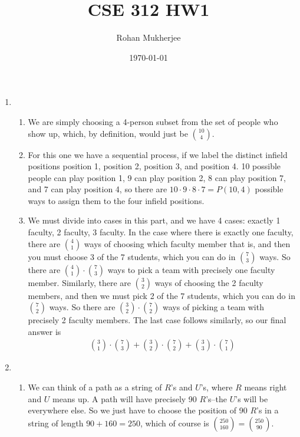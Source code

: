 \documentclass[12pt]{article}
\title{CSE 312 HW1}
\date{\today}
\author{Rohan Mukherjee}
\theoremstyle{definition}
\theoremstyle{remark}
\begin{document}
	\maketitle
	\begin{enumerate}[leftmargin=\labelsep]
		\item \begin{enumerate}
			\item We are simply choosing a 4-person subset from the set of people who show up, which, by definition, would just be $10 \choose 4$.
			
			\item For this one we have a sequential process, if we label the distinct infield positions position 1, position 2, position 3, and position 4. 10 possible people can play position 1, 9 can play position 2, 8 can play position 7, and 7 can play position 4, so there are $10 \cdot 9 \cdot 8 \cdot 7 = P(10, 4)$ possible ways to assign them to the four infield positions.
			
			\item We must divide into cases in this part, and we have 4 cases: exactly 1 faculty, 2 faculty, 3 faculty. In the case where there is exactly one faculty, there are $4 \choose 1$ ways of choosing which faculty member that is, and then you must choose 3 of the 7 students, which you can do in $7 \choose 3$ ways. So there are ${4 \choose 1} \cdot {7 \choose 3}$ ways to pick a team with precisely one faculty member. Similarly, there are $3 \choose 2$ ways of choosing the 2 faculty members, and then we must pick 2 of the 7 students, which you can do in $7 \choose 2$ ways. So there are ${3 \choose 2} \cdot {7 \choose 2}$ ways of picking a team with precisely 2 faculty members. The last case follows similarly, so our final answer is
			\begin{align*}
				{3 \choose 1} \cdot {7 \choose 3} + {3 \choose 2} \cdot {7 \choose 2} + {3 \choose 3} \cdot {7 \choose 1}
			\end{align*}
		\end{enumerate}
	
		\newpage
		\item \begin{enumerate}
			\item We can think of a path as a string of $R$'s and $U$'s, where $R$ means right and $U$ means up. A path will have precisely 90 $R$'s--the $U$'s will be everywhere else. So we just have to choose the position of 90 $R$'s in a string of length $90 + 160 = 250$, which of course is ${250 \choose 160} = {250 \choose 90}$.
			

\end{enumerate}
\end{enumerate}
\end{document}
